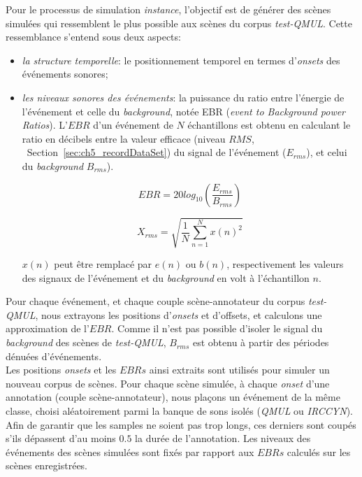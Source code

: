 Pour le processus de simulation \emph{instance}, l'objectif est de générer des scènes simulées qui ressemblent le plus possible aux scènes du corpus \emph{test-QMUL}. Cette ressemblance s'entend sous deux aspects:

\begin{itemize}
\item \emph{la structure temporelle}: le positionnement temporel en termes d'\emph{onsets} des événements sonores;
\item \emph{les niveaux sonores des événements}: la puissance du ratio entre l'énergie de l'événement et celle du \emph{background}, notée EBR (\emph{event to Background power Ratios}). L'$EBR$ d'un événement de $N$ échantillons est obtenu en calculant le ratio en décibels entre la valeur efficace (niveau $RMS$, \cf~Section~\ref{sec:ch5_recordDataSet}) du signal de l'événement ($E_{rms}$), et celui du \emph{background}  $B_{rms}$).

\begin{equation}
\label{eq:ch7_eq1}
EBR=20log_{10} \left(  \dfrac{E_{rms}}{B_{rms}} \right) 
\end{equation}

\begin{equation}
\label{eq:ch7_eq2}
X_{rms}=\sqrt{\dfrac{1}{N} \sum_{n=1}^{N} x(n)^2}
\end{equation}

$x(n)$ peut être remplacé par $e(n)$ ou $b(n)$, respectivement les valeurs des signaux de l'événement et du \emph{background} en volt à l'échantillon $n$. 
\end{itemize}

Pour chaque événement, et chaque couple scène-annotateur du corpus \emph{test-QMUL}, nous extrayons les positions d'\emph{onsets} et d'{offsets}, et calculons une approximation de l'$EBR$. Comme il n'est pas possible d'isoler le signal du \emph{background} des scènes de \emph{test-QMUL}, $B_{rms}$ est obtenu à partir des périodes dénuées d'événements. \\
 

Les positions \emph{onsets} et les $EBRs$ ainsi extraits sont utilisés pour simuler un nouveau corpus de scènes. Pour chaque scène simulée, à chaque \emph{onset} d'une annotation (couple scène-annotateur), nous plaçons un événement de la même classe, choisi aléatoirement parmi la banque de sons isolés (\emph{QMUL} ou \emph{IRCCYN}). Afin de garantir que les samples ne soient pas trop longs, ces derniers sont coupés s'ils dépassent d'au moins $0.5$ la durée de l'annotation. Les niveaux des événements des scènes simulées sont fixés par rapport aux $EBRs$ calculés sur les scènes enregistrées. 

